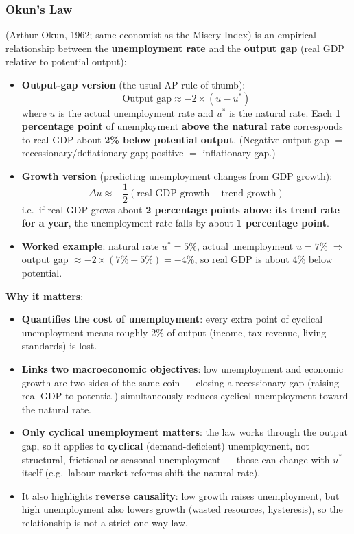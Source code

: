 \subsubsection*{Okun's Law}
 (Arthur Okun, 1962; same economist as the Misery Index) is an empirical relationship between the \textbf{unemployment rate} and the \textbf{output gap} (real GDP relative to potential output):
\begin{itemize}
  \item \textbf{Output-gap version} (the usual AP rule of thumb):
  \[\text{Output gap} \approx -2 \times (u - u^*)\]
  where $u$ is the actual unemployment rate and $u^*$ is the natural rate. Each \textbf{1 percentage point} of unemployment \textbf{above the natural rate} corresponds to real GDP about \textbf{2\% below potential output}. (Negative output gap $=$ recessionary/deflationary gap; positive $=$ inflationary gap.)
  \item \textbf{Growth version} (predicting unemployment changes from GDP growth):
  \[\Delta u \approx -\dfrac{1}{2}\left(\text{real GDP growth} - \text{trend growth}\right)\]
  i.e.\ if real GDP grows about \textbf{2 percentage points above its trend rate for a year}, the unemployment rate falls by about \textbf{1 percentage point}.
  \item \textbf{Worked example}: natural rate $u^* = 5\%$, actual unemployment $u = 7\%$ $\Rightarrow$ output gap $\approx -2 \times (7\% - 5\%) = -4\%$, so real GDP is about 4\% below potential.
\end{itemize}
\textbf{Why it matters}:
\begin{itemize}
  \item \textbf{Quantifies the cost of unemployment}: every extra point of cyclical unemployment means roughly 2\% of output (income, tax revenue, living standards) is lost.
  \item \textbf{Links two macroeconomic objectives}: low unemployment and economic growth are two sides of the same coin --- closing a recessionary gap (raising real GDP to potential) simultaneously reduces cyclical unemployment toward the natural rate.
  \item \textbf{Only cyclical unemployment matters}: the law works through the output gap, so it applies to \textbf{cyclical} (demand-deficient) unemployment, not structural, frictional or seasonal unemployment --- those can change with $u^*$ itself (e.g.\ labour market reforms shift the natural rate).
  \item It also highlights \textbf{reverse causality}: low growth raises unemployment, but high unemployment also lowers growth (wasted resources, hysteresis), so the relationship is not a strict one-way law.
\end{itemize}
